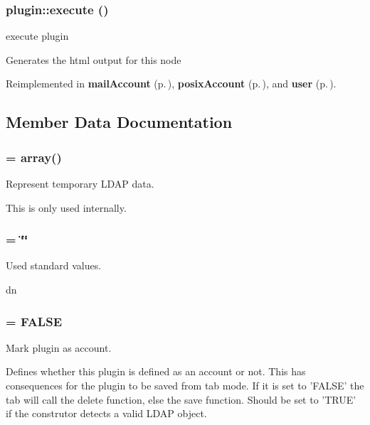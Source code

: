 \subsubsection{\setlength{\rightskip}{0pt plus 5cm}plugin::execute ()}\label{classplugin_a1}


execute plugin 

Generates the html output for this node 

Reimplemented in {\bf mail\-Account} {\rm (p.\,\pageref{classmailAccount_a4})}, {\bf posix\-Account} {\rm (p.\,\pageref{classposixAccount_a1})}, and {\bf user} {\rm (p.\,\pageref{classuser_a1})}.

\subsection{Member Data Documentation}
\subsubsection{ = array()}\label{classplugin_o3}


Represent temporary LDAP data. 

This is only used internally. 
\subsubsection{ = \char`\"{}\char`\"{}}\label{classplugin_o4}


Used standard values. 

dn 
\subsubsection{ = FALSE}\label{classplugin_o1}


Mark plugin as account. 

Defines whether this plugin is defined as an account or not. This has consequences for the plugin to be saved from tab mode. If it is set to 'FALSE' the tab will call the delete function, else the save function. Should be set to 'TRUE' if the construtor detects a valid LDAP object.

